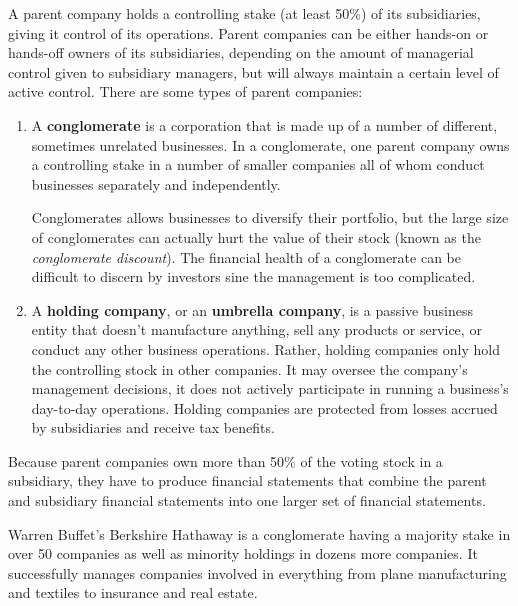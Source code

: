 \documentclass{article}
\begin{document}
      \begin{definition}
        A parent company holds a controlling stake (at least 50\%) of its subsidiaries, giving it control of its operations. Parent companies can be either hands-on or hands-off owners of its subsidiaries, depending on the amount of managerial control given to subsidiary managers, but will always maintain a certain level of active control. There are some types of parent companies:
        \begin{enumerate}
          \item A \textbf{conglomerate} is a corporation that is made up of a number of different, sometimes unrelated businesses. In a conglomerate, one parent company owns a controlling stake in a number of smaller companies all of whom conduct businesses separately and independently. 
          
          Conglomerates allows businesses to diversify their portfolio, but the large size of conglomerates can actually hurt the value of their stock (known as the \textit{conglomerate discount}). The financial health of a conglomerate can be difficult to discern by investors sine the management is too complicated. 
          \item A \textbf{holding company}, or an \textbf{umbrella company}, is a passive business entity that doesn't manufacture anything, sell any products or service, or conduct any other business operations. Rather, holding companies only hold the controlling stock in other companies. It may oversee the company's management decisions, it does not actively participate in running a business's day-to-day operations. Holding companies are protected from losses accrued by subsidiaries and receive tax benefits.
        \end{enumerate}
        Because parent companies own more than 50\% of the voting stock in a subsidiary, they have to produce financial statements that combine the parent and subsidiary financial statements into one larger set of financial statements. 
      \end{definition}

      \begin{example}
        Warren Buffet's Berkshire Hathaway is a conglomerate having a majority stake in over 50 companies as well as minority holdings in dozens more companies. It successfully manages companies involved in everything from plane manufacturing and textiles to insurance and real estate. 
      \end{example}
\end{document}
